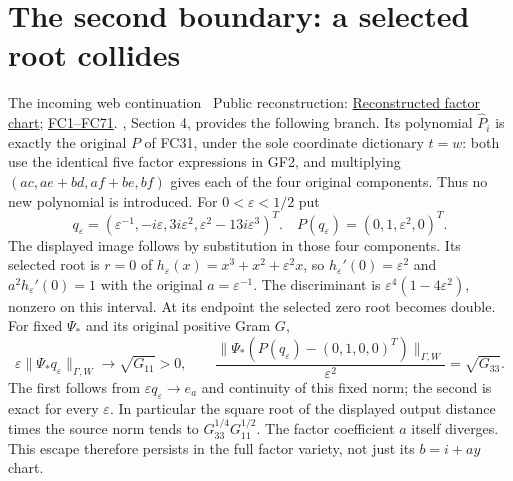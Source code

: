 \documentclass[11pt]{article}
\begin{document}
\section{The second boundary: a selected root collides}
The incoming web continuation \cite{WebFable}%
~Public reconstruction: \href{https://github.com/KokunoYumeto/zeta-function-research-reader/blob/689a8f87e9c12b7a99b01b3123438c6751ee608f/workbenches/splitzero-tandem/continuations/20260920-fable-boundary-action/source_intake/PROOF.md\#L1}{Reconstructed factor chart}; \href{https://github.com/KokunoYumeto/zeta-function-research-reader/blob/689a8f87e9c12b7a99b01b3123438c6751ee608f/workbenches/splitzero-tandem/continuations/20260920-fable-conductor/FABLE_TO_ORIGINAL_CONDUCTOR.tex\#L52}{FC1--FC71}.%
{}, Section 4, provides
the following branch. Its polynomial $\widehat P_i$ is exactly the
original $P$ of FC31, under the sole coordinate dictionary $t=w$:
both use the identical five factor expressions in GF2, and multiplying
$(ac,ae+bd,af+be,bf)$ gives each of the four original components.
Thus no new polynomial is introduced. For $0<\varepsilon<1/2$ put
\[
 q_\varepsilon=(\varepsilon^{-1},-i\varepsilon,
          3i\varepsilon^2,\varepsilon^2-13i\varepsilon^3)^T.
 \quad P(q_\varepsilon)=(0,1,\varepsilon^2,0)^T.
 \tag{RC1}
\]
The displayed image follows by substitution in those four components.
Its selected root is $r=0$ of $h_\varepsilon(x)=x^3+x^2+
\varepsilon^2x$, so $h_\varepsilon'(0)=\varepsilon^2$ and
$a^2h_\varepsilon'(0)=1$ with the original $a=\varepsilon^{-1}$.
The discriminant is $\varepsilon^4(1-4\varepsilon^2)$, nonzero
on this interval. At its endpoint the selected zero root becomes
double. For fixed $\Psi_*$ and its original positive Gram $G$,
\[
 \varepsilon\|\Psi_*q_\varepsilon\|_{\Gamma,W}
       \longrightarrow\sqrt{G_{11}}>0,\qquad
 \frac{\|\Psi_*(P(q_\varepsilon)-(0,1,0,0)^T)\|_{\Gamma,W}}
      {\varepsilon^2}=\sqrt{G_{33}}.
 \tag{RC2}
\]
The first follows from $\varepsilon q_\varepsilon\to e_a$ and
continuity of this fixed norm; the second is exact for every
$\varepsilon$. In particular the square root of the displayed
output distance times the source norm tends to
$G_{33}^{1/4}G_{11}^{1/2}$. The factor coefficient $a$ itself
diverges. This escape therefore persists in the full factor variety,
not just its $b=i+ay$ chart.
\end{document}
